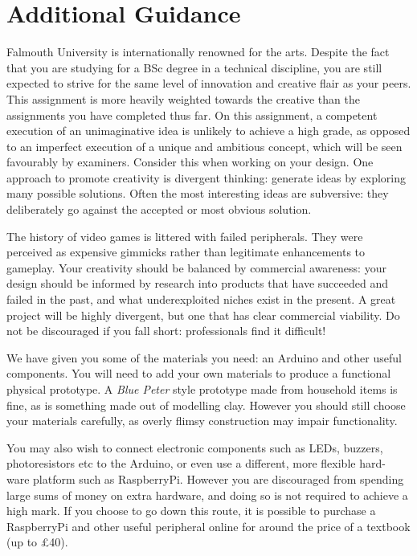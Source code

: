 \documentclass{../fal_assignment}
\begin{document}
\section*{Additional Guidance}
Falmouth University is internationally renowned for the arts. Despite the fact that you are studying for a BSc degree in a technical discipline, you are still expected to strive for the same level of innovation and creative flair as your peers. This assignment is more heavily weighted towards the creative than the assignments you have completed thus far. On this assignment, a competent execution of an unimaginative idea is unlikely to achieve a high grade, as opposed to an imperfect execution of a unique and ambitious concept, which will be seen favourably by examiners. Consider this when working on your design. One approach to promote creativity is divergent thinking: generate ideas by exploring many possible solutions. Often the most interesting ideas are subversive: they deliberately go against the accepted or most obvious solution.

The history of video games is littered with failed peripherals. They were perceived as expensive gimmicks rather than legitimate enhancements to gameplay. Your creativity should be balanced by commercial awareness: your design should be informed by research into products that have succeeded and failed in the past, and what underexploited niches exist in the present. A great project will be highly divergent, but one that has clear commercial viability. Do not be discouraged if you fall short: professionals find it difficult! 

We have given you some of the materials you need: an Arduino and other useful components. You will need to add your own materials to produce a functional physical prototype. A \textit{Blue Peter} style prototype made from household items is fine, as is something made out of modelling clay. However you should still choose your materials carefully, as overly flimsy construction may impair functionality. 

You may also wish to connect electronic components such as LEDs, buzzers, photoresistors etc to the Arduino, or even use a different, more flexible hard- ware platform such as RaspberryPi. However you are discouraged from spending large sums of money on extra hardware, and doing so is not required to achieve a high mark. If you choose to go down this route, it is possible to purchase a RaspberryPi and other useful peripheral online for around the price of a textbook (up to \pounds40). 
\end{document}
